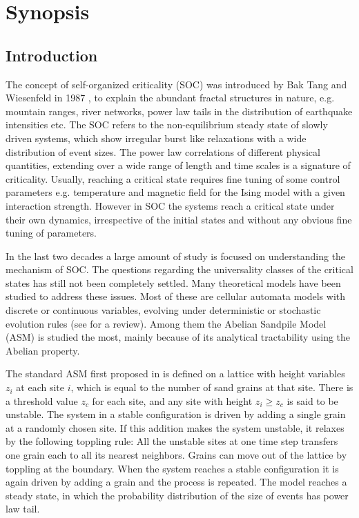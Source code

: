 \documentclass[11pt,a4paper]{book}
\begin{document}
\noindent

\tableofcontents


\listoffigures

\listoftables

\chapter{Synopsis}\label{synopsis}
\section{Introduction}\label{sec:intro}
The concept of self-organized criticality (SOC) was introduced by Bak
Tang and Wiesenfeld in 1987 \cite{btw}, to explain the abundant fractal
structures in nature, e.g. mountain ranges, river networks,
power law tails in the distribution of earthquake intensities etc.
The SOC refers to the non-equilibrium steady state of
slowly driven systems, which show irregular burst like relaxations
with a wide distribution of event sizes. The power law correlations of
different physical quantities, extending over a wide range of length and time scales is a signature of
criticality. Usually, reaching a critical state requires fine tuning
of some control parameters e.g. temperature and magnetic field for the Ising model with a
given interaction strength.
However in SOC the systems reach a critical state under their
own dynamics, irrespective of the initial states and without any
obvious fine tuning of parameters.

In the last two decades a large amount of study is focused on
understanding the mechanism of SOC. The questions regarding the
universality classes of the critical
states has still not been completely settled.
Many theoretical models have been studied to address these issues.
Most of these are cellular automata models with discrete or
continuous variables, evolving under deterministic or
stochastic evolution rules (see \cite{dharphysica06} for a review).
Among them the Abelian Sandpile Model (ASM) is studied the most, mainly
because of its analytical tractability using the Abelian property\cite{dharprl}.

The standard ASM first proposed in \cite{btw} is defined on a
lattice with height variables $z_{i}$ at each site $i$, which is equal to the number of
sand grains at that site. There is a threshold value $z_{c}$ for
each site, and any site with height $z_{i}\ge z_{c}$ is said to be unstable.
The system in a stable configuration is driven by adding a single grain at
a randomly chosen site. If this addition makes the system unstable, it
relaxes by the following toppling rule: All the unstable sites at one
time step transfers one grain each to all its nearest neighbors. Grains can move out of the
lattice by toppling at the boundary. When the system reaches a stable
configuration it is again driven by adding a grain and the process is
repeated. The model reaches a steady state, in which the
probability distribution of the size of events has power law tail.
\end{document}
